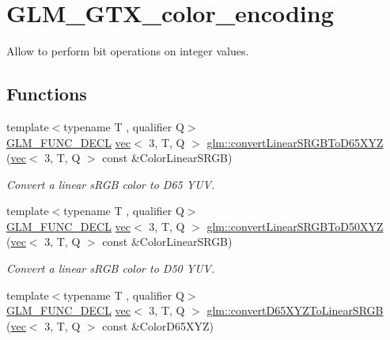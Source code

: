 \hypertarget{group__gtx__color__encoding}{}\section{G\+L\+M\+\_\+\+G\+T\+X\+\_\+color\+\_\+encoding}
\label{group__gtx__color__encoding}


Allow to perform bit operations on integer values.  


\subsection*{Functions}
\begin{DoxyCompactItemize}
\item 
{\footnotesize template$<$typename T , qualifier Q$>$ }\\\hyperlink{setup_8hpp_ab2d052de21a70539923e9bcbf6e83a51}{G\+L\+M\+\_\+\+F\+U\+N\+C\+\_\+\+D\+E\+CL} \hyperlink{structglm_1_1vec}{vec}$<$ 3, T, Q $>$ \hyperlink{group__gtx__color__encoding_gaf9e130d9d4ccf51cc99317de7449f369}{glm\+::convert\+Linear\+S\+R\+G\+B\+To\+D65\+X\+YZ} (\hyperlink{structglm_1_1vec}{vec}$<$ 3, T, Q $>$ const \&Color\+Linear\+S\+R\+GB)
\begin{DoxyCompactList}\small\item\em Convert a linear s\+R\+GB color to D65 Y\+UV. \end{DoxyCompactList}\item 
{\footnotesize template$<$typename T , qualifier Q$>$ }\\\hyperlink{setup_8hpp_ab2d052de21a70539923e9bcbf6e83a51}{G\+L\+M\+\_\+\+F\+U\+N\+C\+\_\+\+D\+E\+CL} \hyperlink{structglm_1_1vec}{vec}$<$ 3, T, Q $>$ \hyperlink{group__gtx__color__encoding_ga1522ba180e3d83d554a734056da031f9}{glm\+::convert\+Linear\+S\+R\+G\+B\+To\+D50\+X\+YZ} (\hyperlink{structglm_1_1vec}{vec}$<$ 3, T, Q $>$ const \&Color\+Linear\+S\+R\+GB)
\begin{DoxyCompactList}\small\item\em Convert a linear s\+R\+GB color to D50 Y\+UV. \end{DoxyCompactList}\item 
{\footnotesize template$<$typename T , qualifier Q$>$ }\\\hyperlink{setup_8hpp_ab2d052de21a70539923e9bcbf6e83a51}{G\+L\+M\+\_\+\+F\+U\+N\+C\+\_\+\+D\+E\+CL} \hyperlink{structglm_1_1vec}{vec}$<$ 3, T, Q $>$ \hyperlink{group__gtx__color__encoding_ga5265386fc3ac29e4c580d37ed470859c}{glm\+::convert\+D65\+X\+Y\+Z\+To\+Linear\+S\+R\+GB} (\hyperlink{structglm_1_1vec}{vec}$<$ 3, T, Q $>$ const \&Color\+D65\+X\+YZ)

\end{DoxyCompactItemize}
